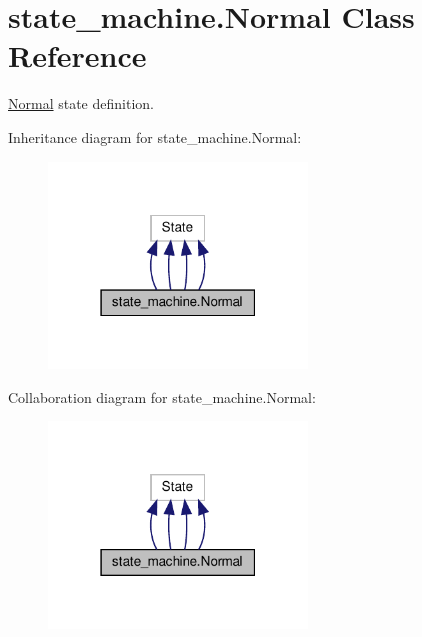 \hypertarget{classstate__machine_1_1Normal}{}\section{state\+\_\+machine.\+Normal Class Reference}
\label{classstate__machine_1_1Normal}


\hyperlink{classstate__machine_1_1Normal}{Normal} state definition.  




Inheritance diagram for state\+\_\+machine.\+Normal\+:
\nopagebreak
\begin{figure}[H]
\begin{center}
\leavevmode
\includegraphics[width=195pt]{classstate__machine_1_1Normal__inherit__graph}
\end{center}
\end{figure}


Collaboration diagram for state\+\_\+machine.\+Normal\+:
\nopagebreak
\begin{figure}[H]
\begin{center}
\leavevmode
\includegraphics[width=195pt]{classstate__machine_1_1Normal__coll__graph}
\end{center}
\end{figure}
